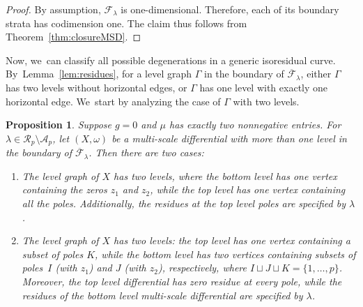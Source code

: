 \documentclass[JEP,XML,SOM,Unicode,NoFloatCountersInSection,published]{cedram}
\newtheorem{prop}[thm]{Proposition}
\theoremstyle{definition}
\begin{document}
\begin{proof}
By assumption, $\mathcal F_{\lambda}$ is one-dimensional. Therefore, each of its boundary strata has codimension one. The claim thus follows from Theorem~\ref{thm:closureMSD}.
\end{proof}

Now, we~can classify all possible degenerations in a generic isoresidual curve. By~Lemma~\ref{lem:residues}, for a level graph $\Gamma$ in the boundary of $\overline{\mathcal F}_\lambda$, either $\Gamma$ has two levels without horizontal edges, or $\Gamma$ has one level with exactly one horizontal edge. We~start by analyzing the case of $\Gamma$ with two levels.
\begin{prop}
\label{prop:F-boundary}
Suppose $g=0$ and $\mu$ has exactly two nonnegative entries.
For $\lambda \in \mathcal{R}_{p} \setminus \mathcal{A}_{p}$,
let $(X,\omega)$ be a multi-scale differential with more than one level in the boundary of $\overline{\mathcal F}_\lambda$. Then there are two cases:
\begin{enumerate}
\item\label{prop:F-boundary1}
The level graph of $X$ has two levels, where the bottom level has one vertex containing the zeros $z_1$ and $z_2$, while the top level has one vertex containing all the poles. Additionally, the residues at the top level poles are specified by $\lambda$.

\item\label{prop:F-boundary2}
The level graph of $X$ has two levels: the top level has one vertex containing a subset of poles $K$, while the bottom level has two vertices containing subsets of poles~$I$ (with $z_1$) and $J$ (with $z_2$), respectively, where $I\sqcup J \sqcup K = \{1, \ldots, p\}$. Moreover, the top level differential has zero residue at every pole, while the residues of the bottom level multi-scale differential are specified by $\lambda$.
\end{enumerate}
\end{prop}
\end{document}
